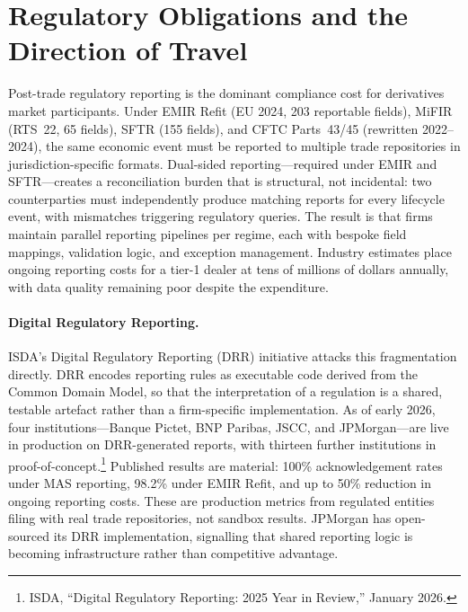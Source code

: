 \documentclass[11pt,a4paper]{article}
\begin{document}
\clearpage
\section{Regulatory Obligations and the Direction of Travel}
\label{sec:regulatory}

Post-trade regulatory reporting is the dominant compliance cost for derivatives market participants. Under EMIR Refit (EU 2024, 203 reportable fields), MiFIR (RTS~22, 65 fields), SFTR (155 fields), and CFTC Parts~43/45 (rewritten 2022--2024), the same economic event must be reported to multiple trade repositories in jurisdiction-specific formats. Dual-sided reporting---required under EMIR and SFTR---creates a reconciliation burden that is structural, not incidental: two counterparties must independently produce matching reports for every lifecycle event, with mismatches triggering regulatory queries. The result is that firms maintain parallel reporting pipelines per regime, each with bespoke field mappings, validation logic, and exception management. Industry estimates place ongoing reporting costs for a tier-1 dealer at tens of millions of dollars annually, with data quality remaining poor despite the expenditure.

\paragraph{Digital Regulatory Reporting.}
ISDA's Digital Regulatory Reporting (DRR) initiative attacks this fragmentation directly. DRR encodes reporting rules as executable code derived from the Common Domain Model, so that the interpretation of a regulation is a shared, testable artefact rather than a firm-specific implementation. As of early 2026, four institutions---Banque Pictet, BNP Paribas, JSCC, and JPMorgan---are live in production on DRR-generated reports, with thirteen further institutions in proof-of-concept.\footnote{ISDA, ``Digital Regulatory Reporting: 2025 Year in Review,'' January 2026.} Published results are material: 100\% acknowledgement rates under MAS reporting, 98.2\% under EMIR Refit, and up to 50\% reduction in ongoing reporting costs. These are production metrics from regulated entities filing with real trade repositories, not sandbox results. JPMorgan has open-sourced its DRR implementation, signalling that shared reporting logic is becoming infrastructure rather than competitive advantage.
\end{document}
